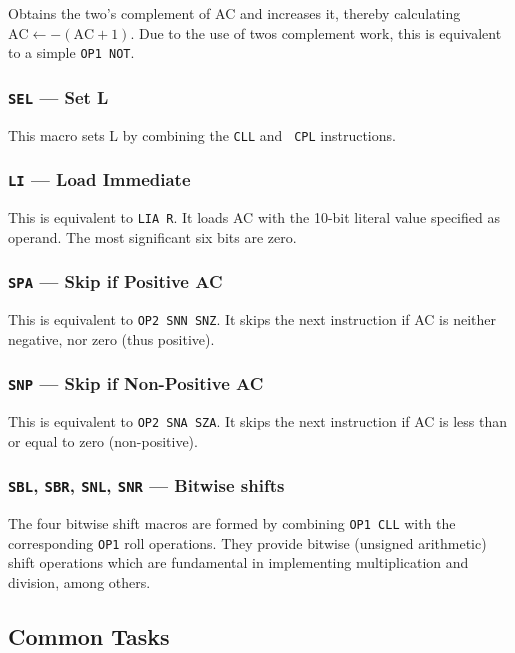 \documentclass[11pt,a4paper,twocolumns]{article}
\newcommand\register[1]{\textsf{#1}}
\newcommand\A{\register{AC}}
\newcommand\Lreg{\register{L}}
\begin{document}
Obtains the two's complement of \A{} and increases it, thereby
calculating $\mbox{AC} \leftarrow -(\mbox{AC} + 1)$. Due to the use of
twos complement work, this is equivalent to a simple {\tt OP1 NOT}.

\subsubsection{{\tt SEL} — Set L}

This macro sets \Lreg{} by combining the {\tt CLL} and {\tt
  CPL} instructions.

\subsubsection{{\tt LI} — Load Immediate}

This is equivalent to {\tt LIA R}. It loads \A{} with the 10-bit literal
value specified as operand. The most significant six bits are zero.

\subsubsection{{\tt SPA} — Skip if Positive \A}

This is equivalent to {\tt OP2 SNN SNZ}. It skips the next instruction
if \A{} is neither negative, nor zero (thus positive).

\subsubsection{{\tt SNP} — Skip if Non-Positive \A}

This is equivalent to {\tt OP2 SNA SZA}. It skips the next instruction
if \A{} is less than or equal to zero (non-positive).

\subsubsection{{\tt SBL}, {\tt SBR}, {\tt SNL}, {\tt SNR} — Bitwise shifts}

The four bitwise shift macros are formed by combining {\tt OP1 CLL} with
the corresponding {\tt OP1} roll operations. They provide bitwise
(unsigned arithmetic) shift operations which are fundamental in
implementing multiplication and division, among others.

\subsection{Common Tasks}
\end{document}
